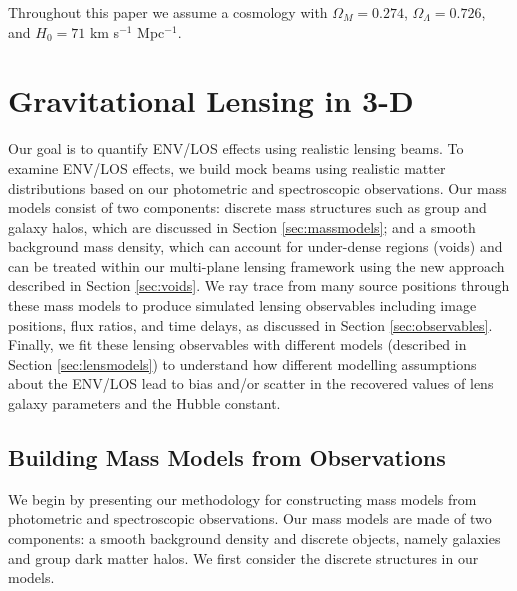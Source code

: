 \documentclass{emulateapj}
\begin{document}
Throughout this paper we assume a cosmology with $\Omega_M = 0.274$, $\Omega_\Lambda = 0.726$, and $H_0 = 71$ km s$^{-1}$ Mpc$^{-1}$.


\section{Gravitational Lensing in 3-D}
\label{sec:3DMassModels}

Our goal is to quantify ENV/LOS effects using realistic lensing beams. To examine ENV/LOS effects, we build mock beams using realistic matter distributions based on our photometric and spectroscopic observations. Our mass models consist of two components: discrete mass structures such as group and galaxy halos, which are discussed in Section \ref{sec:massmodels}; and a smooth background mass density, which can account for under-dense regions (voids) and can be treated within our multi-plane lensing framework using the new approach described in Section \ref{sec:voids}. We ray trace from many source positions through these mass models to produce simulated lensing observables including image positions, flux ratios, and time delays, as discussed in Section \ref{sec:observables}. Finally, we fit these lensing observables with different models (described in Section \ref{sec:lensmodels}) to understand how different modelling assumptions about the ENV/LOS lead to bias and/or scatter in the recovered values of lens galaxy parameters and the Hubble constant.

\subsection{Building Mass Models from Observations \label{sec:massmodels}}
We begin by presenting our methodology for constructing mass models from photometric and spectroscopic observations. Our mass models are made of two components: a smooth background density and discrete objects, namely galaxies and group dark matter halos. We first consider the discrete structures in our models.
\end{document}
